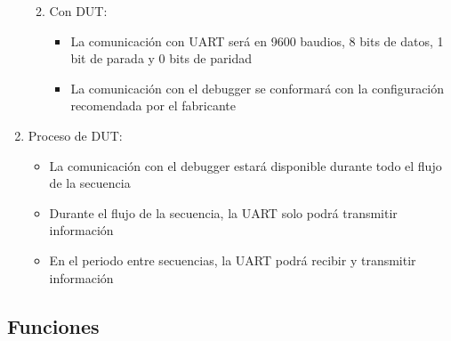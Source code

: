 \documentclass[
11pt, %
]{charter}
\begin{document}
\begin{enumerate}
\begin{enumerate}
\begin{itemize}
\begin{itemize}
			\end{itemize}
		\end{itemize}
		\item Con DUT:
		\begin{itemize}
			\item La comunicación con UART será en 9600 baudios, 8 bits de datos, 1 bit de parada y 0 bits de paridad
			\item La comunicación con el debugger se conformará con la configuración recomendada por el fabricante
		\end{itemize}
	\end{enumerate}
	\item Proceso de DUT:
	\begin{itemize}
		\item La comunicación con el debugger estará disponible durante todo el flujo de la secuencia
		\item Durante el flujo de la secuencia, la UART solo podrá transmitir información
		\item En el periodo entre secuencias, la UART podrá recibir y transmitir información
	\end{itemize}
\end{enumerate}

\subsection{Funciones}
\label{sub:funciones}
\end{document}
